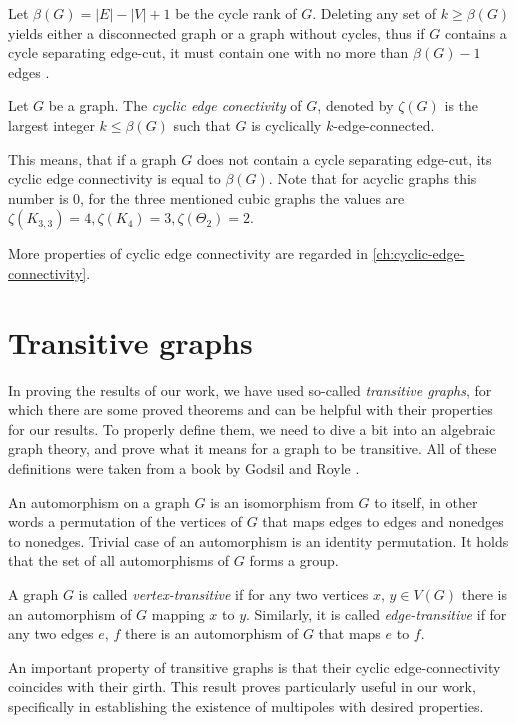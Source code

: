 \documentclass[12pt, twoside]{book}
\begin{document}
Let $\beta(G)=|E|-|V|+1$ be the cycle rank of $G$. Deleting any set of $k\geq \beta(G)$ yields either a disconnected graph or a graph without cycles, thus if $G$ contains a cycle separating edge-cut, it must contain one with no more than $\beta(G)-1$ edges \cite{atoms-of-cyclic}.

\begin{definition}
	Let $G$ be a graph. The \textit{cyclic edge conectivity} of $G$, denoted by $\zeta(G)$ is the largest integer $k \leq \beta(G)$ such that $G$ is cyclically $k$-edge-connected.
\end{definition}

This means, that if a graph $G$ does not contain a cycle separating edge-cut, its cyclic edge connectivity is equal to $\beta(G)$. Note that for acyclic graphs this number is 0, for the three mentioned cubic graphs the values are $\zeta(K_{3,3})=4, \zeta(K_4)=3, \zeta(\Theta_2)=2$.

More properties of cyclic edge connectivity are regarded in \cref{ch:cyclic-edge-connectivity}.

\section{Transitive graphs}

In proving the results of our work, we have used so-called \textit{transitive graphs}, for which there are some proved theorems and can be helpful with their properties for our results. To properly define them, we need to dive a bit into an algebraic graph theory, and prove what it means for a graph to be transitive. All of these definitions were taken from a book by Godsil and Royle \cite{algebraic-graph-theory}.

An automorphism on a graph $G$ is an isomorphism from $G$ to itself, in other words a permutation of the vertices of $G$ that maps edges to edges and nonedges to nonedges. Trivial case of an automorphism is an identity permutation. It holds that the set of all automorphisms of $G$ forms a group.

A graph $G$ is called \emph{vertex-transitive} if for any two vertices $x,\,y\in V(G)$ there is an automorphism of $G$ mapping $x$ to $y$. Similarly, it is called \emph{edge-transitive} if for any two edges $e,\,f$ there is an automorphism of $G$ that maps $e$ to $f$.

An important property of transitive graphs is that their cyclic edge-connectivity coincides with their girth. This result proves particularly useful in our work, specifically in establishing the existence of multipoles with desired properties.
\end{document}
